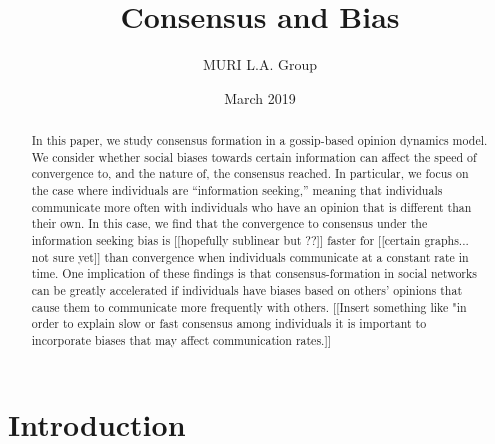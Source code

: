 \documentclass{amsart}
\title{Consensus and Bias}
\author{MURI L.A. Group}
\date{March 2019}
\theoremstyle{remark}
\begin{document}
\begin{abstract}
	In this paper, we study consensus formation in a gossip-based opinion dynamics model.  We consider whether social biases towards certain information can affect the speed of convergence to, and the nature of, the consensus reached.  In particular, we focus on the case where individuals are ``information seeking,'' meaning that individuals communicate more often with individuals who have an opinion that is different than their own.  In this case, we find that the convergence to consensus under the information seeking bias is [[hopefully sublinear but ??]] faster for [[certain graphs... not sure yet]] than convergence when individuals communicate at a constant rate in time. One implication of these findings is that consensus-formation in social networks can be greatly accelerated if individuals have biases based on others' opinions that cause them to communicate more frequently with others. [[Insert something like "in order to explain slow or fast consensus among individuals it is important to incorporate biases that may affect communication rates.]]
\end{abstract}

\maketitle

\section{Introduction}
\end{document}
